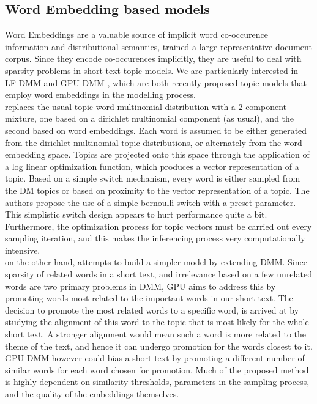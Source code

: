 \documentclass{sig-alternate-05-2015}
\begin{document}
\subsection{Word Embedding based models}
Word Embeddings are a valuable source of implicit word co-occurence information and distributional semantics, trained a large representative document corpus. Since they encode co-occurences implicitly, they are useful to deal with sparsity problems in short text topic models. We are particularly interested in LF-DMM \cite{lfdmm} and GPU-DMM \cite{gpudmm}, which are both recently proposed topic models that employ word embeddings in the modelling process.
\\
\cite{lfdmm} replaces the usual topic word multinomial distribution with a 2 component mixture, one based on a dirichlet multinomial component (as usual), and the second based on word embeddings. Each word is assumed to be either generated from the dirichlet multinomial topic distributions, or alternately from the word embedding space. Topics are projected onto this space through the application of a log linear optimization function, which produces a vector representation of a topic. Based on a simple switch mechanism, every word is either sampled from the DM topics or based on proximity to the vector representation of a topic. The authors propose the use of a simple bernoulli switch with a preset parameter. This simplistic switch design appears to hurt performance quite a bit. Furthermore, the optimization process for topic vectors must be carried out every sampling iteration, and this makes the inferencing process very computationally intensive.
\\
\cite{gpudmm} on the other hand, attempts to build a simpler model by extending DMM. Since sparsity of related words in a short text, and irrelevance based on a few unrelated words are two primary problems in DMM, GPU aims to address this by promoting words most related to the important words in our short text. The decision to promote the most related words to a specific word, is arrived at by studying the alignment of this word to the topic that is most likely for the whole short text. A stronger alignment would mean such a word is more related to the theme of the text, and hence it can undergo promotion for the words closest to it. GPU-DMM however could bias a short text by promoting a different number of similar words for each word chosen for promotion. Much of the proposed method is highly dependent on similarity thresholds, parameters in the sampling process, and the quality of the embeddings themselves.
\end{document}
